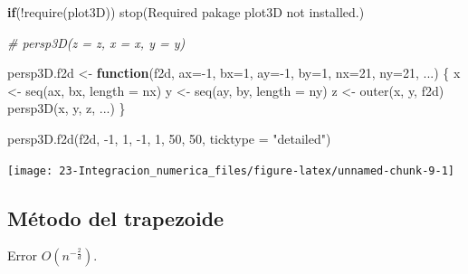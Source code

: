\documentclass[
]{book}
\newenvironment{Shaded}{\begin{snugshade}}{\end{snugshade}}
\newcommand{\AttributeTok}[1]{\textcolor[rgb]{0.77,0.63,0.00}{#1}}
\newcommand{\CommentTok}[1]{\textcolor[rgb]{0.56,0.35,0.01}{\textit{#1}}}
\newcommand{\ControlFlowTok}[1]{\textcolor[rgb]{0.13,0.29,0.53}{\textbf{#1}}}
\newcommand{\DecValTok}[1]{\textcolor[rgb]{0.00,0.00,0.81}{#1}}
\newcommand{\FunctionTok}[1]{\textcolor[rgb]{0.00,0.00,0.00}{#1}}
\newcommand{\NormalTok}[1]{#1}
\newcommand{\OtherTok}[1]{\textcolor[rgb]{0.56,0.35,0.01}{#1}}
\newcommand{\SpecialCharTok}[1]{\textcolor[rgb]{0.00,0.00,0.00}{#1}}
\newcommand{\StringTok}[1]{\textcolor[rgb]{0.31,0.60,0.02}{#1}}
\theoremstyle{break}
\theoremstyle{definition}
\theoremstyle{definition}
\theoremstyle{definition}
\theoremstyle{definition}
\theoremstyle{remark}
\begin{document}
\begin{Shaded}
\begin{Highlighting}[]
\ControlFlowTok{if}\NormalTok{(}\SpecialCharTok{!}\FunctionTok{require}\NormalTok{(plot3D)) }\FunctionTok{stop}\NormalTok{(}\StringTok{\textquotesingle{}Required pakage \textasciigrave{}plot3D\textasciigrave{} not installed.\textquotesingle{}}\NormalTok{)}

\CommentTok{\# persp3D(z = z, x = x, y = y)}

\NormalTok{persp3D.f2d }\OtherTok{\textless{}{-}} \ControlFlowTok{function}\NormalTok{(f2d, }\AttributeTok{ax=}\SpecialCharTok{{-}}\DecValTok{1}\NormalTok{, }\AttributeTok{bx=}\DecValTok{1}\NormalTok{, }\AttributeTok{ay=}\SpecialCharTok{{-}}\DecValTok{1}\NormalTok{, }\AttributeTok{by=}\DecValTok{1}\NormalTok{, }\AttributeTok{nx=}\DecValTok{21}\NormalTok{, }\AttributeTok{ny=}\DecValTok{21}\NormalTok{, ...) \{ }
\NormalTok{  x }\OtherTok{\textless{}{-}} \FunctionTok{seq}\NormalTok{(ax, bx, }\AttributeTok{length =}\NormalTok{ nx)}
\NormalTok{  y }\OtherTok{\textless{}{-}} \FunctionTok{seq}\NormalTok{(ay, by, }\AttributeTok{length =}\NormalTok{ ny)}
\NormalTok{  z }\OtherTok{\textless{}{-}} \FunctionTok{outer}\NormalTok{(x, y, f2d)}
  \FunctionTok{persp3D}\NormalTok{(x, y, z, ...)}
\NormalTok{\}}

\FunctionTok{persp3D.f2d}\NormalTok{(f2d, }\SpecialCharTok{{-}}\DecValTok{1}\NormalTok{, }\DecValTok{1}\NormalTok{, }\SpecialCharTok{{-}}\DecValTok{1}\NormalTok{, }\DecValTok{1}\NormalTok{, }\DecValTok{50}\NormalTok{, }\DecValTok{50}\NormalTok{, }\AttributeTok{ticktype =} \StringTok{"detailed"}\NormalTok{) }
\end{Highlighting}
\end{Shaded}

\begin{center}\texttt{[image: 23-Integracion\_numerica\_files/figure-latex/unnamed-chunk-9-1]} \end{center}

\hypertarget{muxe9todo-del-trapezoide-1}{%
\subsection{Método del trapezoide}\label{muxe9todo-del-trapezoide-1}}

Error \(O(n^{-\frac{2}{d}})\).
\end{document}
